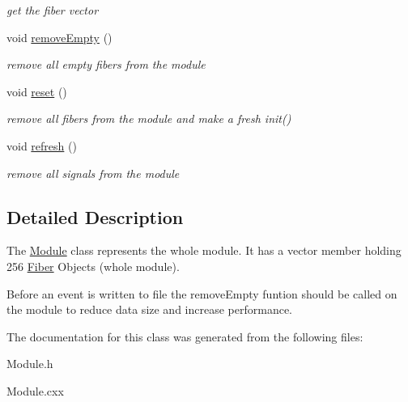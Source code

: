 \begin{DoxyCompactItemize}
\begin{DoxyCompactList}\small\item\em get the fiber vector \end{DoxyCompactList}\item 
\mbox{\label{classModule_ae3fad5d9e4fa039df011b613e32a3f22}} 
void \hyperlink{classModule_ae3fad5d9e4fa039df011b613e32a3f22}{remove\+Empty} ()
\begin{DoxyCompactList}\small\item\em remove all empty fibers from the module \end{DoxyCompactList}\item 
\mbox{\label{classModule_ad086c0abbc26b2e4bc35701a18ff145f}} 
void \hyperlink{classModule_ad086c0abbc26b2e4bc35701a18ff145f}{reset} ()
\begin{DoxyCompactList}\small\item\em remove all fibers from the module and make a fresh init() \end{DoxyCompactList}\item 
\mbox{\label{classModule_af91c494cb8a57de96d96f3e893a129a3}} 
void \hyperlink{classModule_af91c494cb8a57de96d96f3e893a129a3}{refresh} ()
\begin{DoxyCompactList}\small\item\em remove all signals from the module \end{DoxyCompactList}\end{DoxyCompactItemize}


\subsection{Detailed Description}
The \hyperlink{classModule}{Module} class represents the whole module. It has a vector member holding 256 \hyperlink{classFiber}{Fiber} Objects (whole module).

Before an event is written to file the remove\+Empty funtion should be called on the module to reduce data size and increase performance. 

The documentation for this class was generated from the following files\+:\begin{DoxyCompactItemize}
\item 
Module.\+h\item 
Module.\+cxx\end{DoxyCompactItemize}
